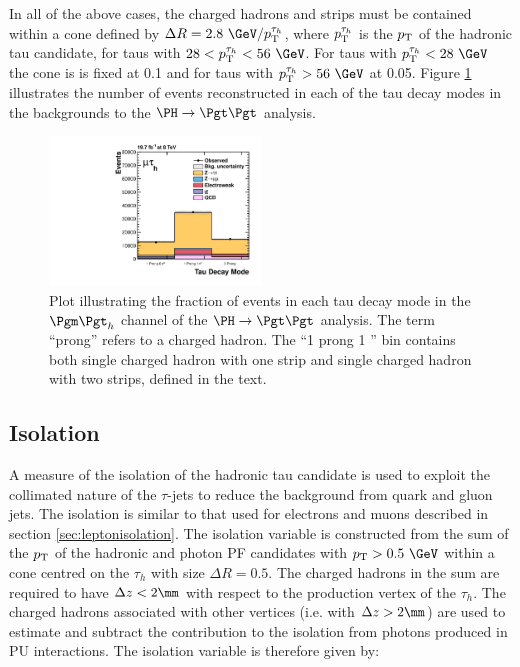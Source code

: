 In all of the above cases, the charged hadrons and strips must be contained
within a cone defined by $\Delta R=2.8~\GeV/\pt^{\tau_{h}}$, where
$p_{\mathrm{T}}^{\tau_{h}}$ is the $p_{\mathrm{T}}$ of the hadronic tau candidate, for taus with $28 <
\pt^{\tau_{h}} < 56~\GeV$. For taus with $\pt^{\tau_{h}} < 28~\GeV$ the cone is
is fixed at 0.1 and for taus with $\pt^{\tau_{h}} > 56~\GeV$ at 0.05. 
Figure \ref{fig:taudecaymode} illustrates the number of events reconstructed in
each of the tau decay modes in the backgrounds to the $\PH \to \Pgt\Pgt$ analysis.

\begin{figure}
\begin{center}
    \includegraphics[width=0.5\textwidth]
      {plots/reco/tau_decay_mode_inclusive_mt_2012.pdf}
\end{center}
\caption{Plot illustrating the fraction of events in each tau decay mode in the
$\mutau$ channel of the $\PH\to\Pgt\Pgt$ analysis. The term ``prong'' refers to a
charged hadron. The ``1 prong 1 \Pgpz'' bin contains both single charged hadron
with one strip and single charged hadron with two strips, defined in the text.
}
\label{fig:taudecaymode}
\end{figure}

\subsection{Isolation}
\label{sec:tauisolation}

A measure of the isolation of the hadronic tau candidate is used to exploit the
collimated nature of the $\tau$-jets to reduce the background from quark and gluon
jets. The isolation is similar to that used for electrons and muons described in
section \ref{sec:leptonisolation}. The isolation variable is constructed from 
the sum of the $p_{\mathrm{T}}$ of the
hadronic and photon \ac{PF} candidates with $\pt > 0.5~\GeV$ within a cone centred on 
the $\tau_{h}$ with size $\Delta R = 0.5$. The charged hadrons in the sum are
required to have $\Delta z < 2\mm$ with respect to the production vertex of the
$\tau_{h}$. The charged hadrons associated with other vertices (i.e. with
$\Delta z > 2\mm$) are used to
estimate and subtract the contribution to the isolation from photons produced in
\ac{PU} interactions. The isolation variable is therefore given by:


